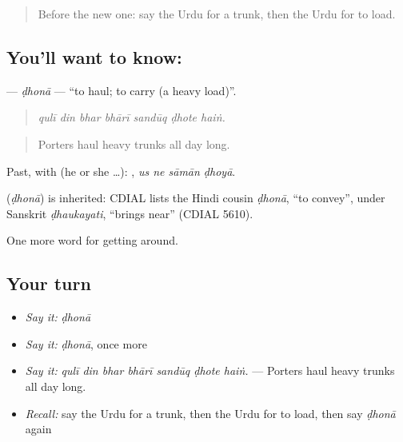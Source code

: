 \label{lesson:UR-C387-dhhona}



\begin{quote}
Before the new one: say the Urdu for a trunk, then the Urdu for to load.
\end{quote}

\subsection*{You'll want to know: }
\textbf{} — \emph{ḍhonā} — \textquotedblleft{}to haul; to carry (a heavy load)\textquotedblright{}.

\begin{quote}
      
\end{quote}

\begin{quote}
\emph{qulī din bhar bhārī sandūq ḍhote haiṅ.}
\end{quote}

\begin{quote}
Porters haul heavy trunks all day long.
\end{quote}

Past, with  (he or she …):    , \emph{us ne sāmān ḍhoyā}.

\begin{cousinweb}
\textbf{} (\emph{ḍhonā}) is inherited: CDIAL lists the Hindi cousin \emph{ḍhonā}, \textquotedblleft{}to convey\textquotedblright{}, under Sanskrit \emph{ḍhaukayati}, \textquotedblleft{}brings near\textquotedblright{} (CDIAL 5610).
\end{cousinweb}

\begin{grammarlens}[title={What you've built}]
One more word for getting around.
\end{grammarlens}

\subsection*{Your turn}
\begin{itemize}
\raggedright
  \item \emph{Say it:} \emph{ḍhonā}
  \item \emph{Say it:} \emph{ḍhonā}, once more
  \item \emph{Say it:} \emph{qulī din bhar bhārī sandūq ḍhote haiṅ.} — Porters haul heavy trunks all day long.
  \item \emph{Recall:} say the Urdu for a trunk, then the Urdu for to load, then say \emph{ḍhonā} again
\end{itemize}

